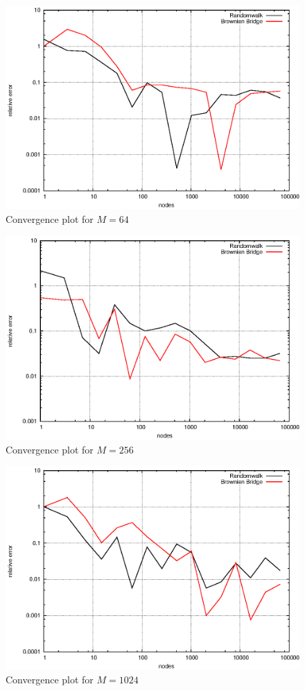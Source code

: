 \documentclass[]{article}
\begin{document}
\begin{figure}[!ht]
\centering
\includegraphics[width=.9\textwidth]{task4_mc_64.eps}
\caption{Convergence plot for $M=64$}
\label{fig:Task4b}
\end{figure}

\begin{figure}[!ht]
\centering
\includegraphics[width=.9\textwidth]{task4_mc_256.eps}
\caption{Convergence plot for $M=256$}
\label{fig:Task4c}
\end{figure}

\begin{figure}[!ht]
\centering
\includegraphics[width=.9\textwidth]{task4_mc_1024.eps}
\caption{Convergence plot for $M=1024$}
\label{fig:Task4d}
\end{figure}
\end{document}
